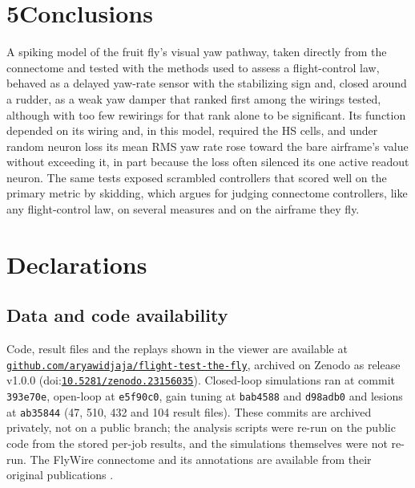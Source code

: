 \documentclass[11pt,letterpaper]{article}
\begin{document}
\protect{}\label{s5}
\section{\texorpdfstring{5\quad Conclusions}{5Conclusions}}\label{conclusions}

\noindent A spiking model of the fruit fly's visual yaw pathway, taken
directly from the connectome and tested with the methods used to assess
a flight-control law, behaved as a delayed yaw-rate sensor with the
stabilizing sign and, closed around a rudder, as a weak yaw damper that
ranked first among the wirings tested, although with too few rewirings
for that rank alone to be significant. Its function depended on its
wiring and, in this model, required the HS cells, and under random
neuron loss its mean RMS yaw rate rose toward the bare airframe's value
without exceeding it, in part because the loss often silenced its one
active readout neuron. The same tests exposed scrambled controllers that
scored well on the primary metric by skidding, which argues for judging
connectome controllers, like any flight-control law, on several measures
and on the airframe they fly.

\protect{}\label{decl}
\section{Declarations}\label{declarations}

\subsection{Data and code
availability}\label{data-and-code-availability}

\noindent Code, result files and the replays shown in the viewer are
available at
\href{https://github.com/aryawidjaja/flight-test-the-fly}{\nolinkurl{github.com/aryawidjaja/flight-test-the-fly}},
archived on Zenodo as release v1.0.0
(doi:\href{https://doi.org/10.5281/zenodo.23156035}{\nolinkurl{10.5281/zenodo.23156035}}).
Closed-loop simulations ran at commit \texttt{393e70e}, open-loop at
\texttt{e5f90c0}, gain tuning at \texttt{bab4588} and \texttt{d98adb0}
and lesions at \texttt{ab35844} (47, 510, 432 and 104 result files).
These commits are archived privately, not on a public branch; the
analysis scripts were re-run on the public code from the stored per-job
results, and the simulations themselves were not re-run. The FlyWire
connectome and its annotations are available from their original
publications \cite{dorkenwald2024,schlegel2024}.
\end{document}
